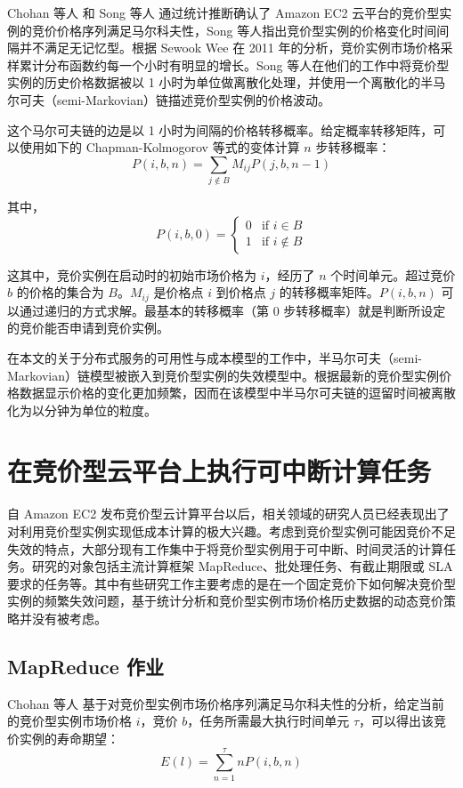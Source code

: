 Chohan 等人 \cite{chohan2010see} 和 Song 等人 \cite{song2012optimal} 通过统计推断确认了 Amazon EC2 云平台的竞价型实例的竞价价格序列满足马尔科夫性，Song 等人指出竞价型实例的价格变化时间间隔并不满足无记忆型。根据 Sewook Wee \cite{5948651} 在 2011 年的分析，竞价实例市场价格采样累计分布函数约每一个小时有明显的增长。Song 等人在他们的工作中将竞价型实例的历史价格数据被以 1 小时为单位做离散化处理，并使用一个离散化的半马尔可夫（semi-Markovian）链描述竞价型实例的价格波动。

这个马尔可夫链的边是以 1 小时为间隔的价格转移概率。给定概率转移矩阵，可以使用如下的 Chapman-Kolmogorov 等式的变体计算 $n$ 步转移概率：
\begin{equation}\label{eq_ck}\nonumber 
P(i, b, n) = \sum_{j \notin B}{M_{ij}P(j, b, n-1)}
\end{equation}

其中，
\begin{equation}\label{eq_ckcond}\nonumber 
P(i, b, 0) = \begin{cases}
0 &\mbox{if $i \in B$}\\
1 &\mbox{if $i \notin B$}
\end{cases}
\end{equation}

这其中，竞价实例在启动时的初始市场价格为 $i$，经历了 $n$ 个时间单元。超过竞价 $b$ 的价格的集合为 $B$。$M_{ij}$ 是价格点 $i$ 到价格点 $j$ 的转移概率矩阵。$P(i, b, n)$ 可以通过递归的方式求解。最基本的转移概率（第 0 步转移概率）就是判断所设定的竞价能否申请到竞价实例。

在本文的关于分布式服务的可用性与成本模型的工作中，半马尔可夫（semi-Markovian）链模型被嵌入到竞价型实例的失效模型中。根据最新的竞价型实例价格数据显示价格的变化更加频繁，因而在该模型中半马尔可夫链的逗留时间被离散化为以分钟为单位的粒度。

\section{在竞价型云平台上执行可中断计算任务}
自 Amazon EC2 发布竞价型云计算平台以后，相关领域的研究人员已经表现出了对利用竞价型实例实现低成本计算的极大兴趣。考虑到竞价型实例可能因竞价不足失效的特点，大部分现有工作集中于将竞价型实例用于可中断、时间灵活的计算任务。研究的对象包括主流计算框架 MapReduce、批处理任务、有截止期限或 SLA 要求的任务等。其中有些研究工作主要考虑的是在一个固定竞价下如何解决竞价型实例的频繁失效问题，基于统计分析和竞价型实例市场价格历史数据的动态竞价策略并没有被考虑。

\subsection{MapReduce 作业}
Chohan 等人 \cite{chohan2010see} 基于对竞价型实例市场价格序列满足马尔科夫性的分析，给定当前的竞价型实例市场价格 $i$，竞价 $b$，任务所需最大执行时间单元 $\tau$，可以得出该竞价实例的寿命期望：
\begin{equation}\label{eq_elife}\nonumber 
E(l) = \sum_{n=1}^{\tau}nP(i, b, n)
\end{equation}

